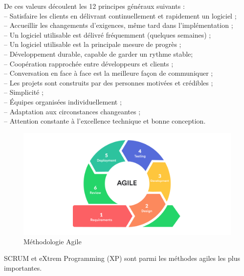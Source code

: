 \documentclass[a4paper, 12pt]{report}
\begin{document}
De ces valeurs découlent les 12 principes généraux suivants : \\
-- Satisfaire les clients en délivrant continuellement et rapidement un logiciel ; \\
-- Accueillir les changements d'exigences, même tard dans l'implémentation ;\\ 
-- Un logiciel utilisable est délivré fréquemment (quelques semaines) ; \\
-- Un logiciel utilisable est la principale mesure de progrès ; \\
-- Développement durable, capable de garder un rythme stable; \\
-- Coopération rapprochée entre développeurs et clients ; \\
-- Conversation en face à face est la meilleure façon de communiquer ; \\ 
-- Les projets sont construits par des personnes motivées et crédibles ; \\
-- Simplicité ; \\
-- Équipes organisées individuellement ; \\ 
-- Adaptation aux circonstances changeantes ; \\ 
-- Attention constante à l'excellence technique et bonne conception. \\
\begin{figure}[H]
    \centering
    \includegraphics[width = 1.2\linewidth]{img/agile.jpg}
    \caption{Méthodologie Agile}
\end{figure}
SCRUM et eXtrem Programming (XP) sont parmi les méthodes agiles les plus importantes. 
\end{document}
